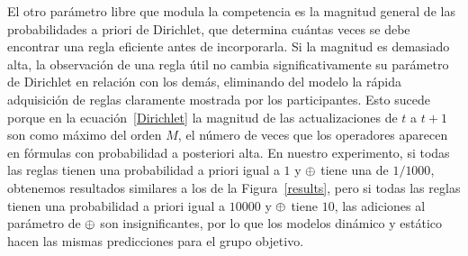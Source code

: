 El otro parámetro libre que modula la competencia es la magnitud general de las probabilidades a priori de Dirichlet, que determina cuántas veces se debe encontrar una regla eficiente antes de incorporarla. Si la magnitud es demasiado alta, la observación de una regla útil no cambia significativamente su parámetro de Dirichlet en relación con los demás, eliminando del modelo la rápida adquisición de reglas claramente mostrada por los participantes. Esto sucede porque en la ecuación~\eqref{Dirichlet} la magnitud de las actualizaciones de $ t $ a $ t + 1 $ son como máximo del orden $ M $, el número de veces que los operadores aparecen en fórmulas con probabilidad a posteriori alta. En nuestro experimento, si todas las reglas tienen una probabilidad a priori igual a $1$ y $ \oplus $ tiene una de $1/1000$, obtenemos resultados similares a los de la Figura~\ref{results}, pero si todas las reglas tienen una probabilidad a priori igual a $10000$ y $ \oplus $ tiene $10$, las adiciones al parámetro de $ \oplus $ son insignificantes, por lo que los modelos dinámico y estático hacen las mismas predicciones para el grupo objetivo.


